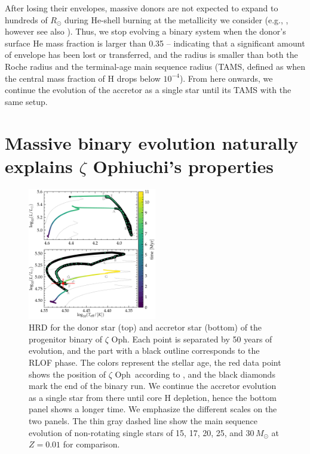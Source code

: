 \documentclass[twocolumn,twocolappendix,trackchanges]{aastex63}
\DeclareRobustCommand{\Secref}[1]{Sec.~\ref{#1}}
\newcommand{\zoph}{$\zeta$ Oph}
\begin{document}
After losing their envelopes, massive donors are not expected to
expand to hundreds of $R_\odot$ during He-shell burning at the
metallicity we consider (e.g., \citealt{laplace:20}, however see also
\citealt{gilkis:19}). Thus, we stop evolving a binary system when the
donor's surface He mass fraction is larger than 0.35 -- indicating
that a significant amount of envelope has been lost or transferred,
and the radius is smaller than both the Roche radius and the
terminal-age main sequence radius (TAMS, defined as when the central
mass fraction of H drops below $10^{-4}$). From here
onwards, %
we continue the evolution of the accretor as a single star until its TAMS
with the same setup.


\section{Massive binary evolution naturally explains $\zeta$
  Ophiuchi's properties}
\label{sec:best_model}

\begin{figure}[tp]
  \includegraphics[width=0.5\textwidth]{HRD_both}
  \caption{HRD for the donor star (top) and accretor star (bottom) of
    the progenitor binary of \zoph. Each point is separated by 50
    years of evolution, and the part with a black outline corresponds
    to the RLOF phase. The colors represent the stellar age, the red
    data point shows the position of \zoph\ according to
    , and the
    black diamonds mark the end of the binary run. We
    continue the accretor evolution as a single star from there until
    core H depletion, hence the bottom panel shows a longer time. We
    emphasize the different scales on the two panels. The thin gray
    dashed line show the main sequence evolution of non-rotating
    single stars of 15, 17, 20, 25, and 30\,$M_\odot$ at $Z=0.01$ for
    comparison.}
  \label{fig:HRD_both}
\end{figure}
\end{document}
